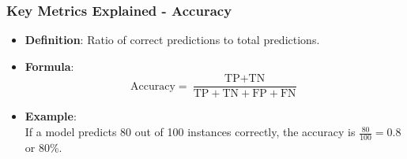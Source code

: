\documentclass[aspectratio=169]{beamer}
\begin{document}
\begin{frame}[fragile]
    \frametitle{Key Metrics Explained - Accuracy}
    \begin{itemize}
        \item \textbf{Definition}: Ratio of correct predictions to total predictions.
        \item \textbf{Formula}:
            \begin{equation}
            \text{Accuracy} = \frac{\text{TP} + \text{TN}}{\text{TP} + \text{TN} + \text{FP} + \text{FN}}
            \end{equation}
        \item \textbf{Example}: \\
            If a model predicts 80 out of 100 instances correctly, the accuracy is \( \frac{80}{100} = 0.8 \) or 80\%.
    \end{itemize}
\end{frame}
\end{document}
